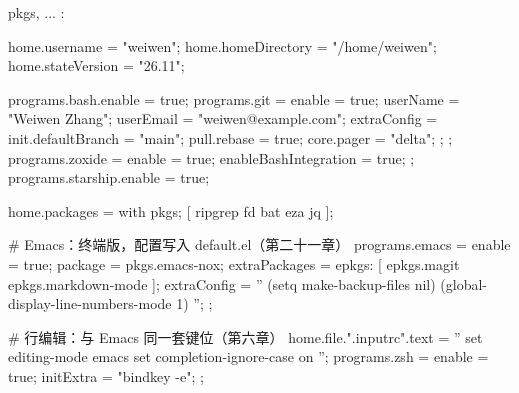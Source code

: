 \begin{nixcode}
{ pkgs, ... }:

{
  home.username = "weiwen";
  home.homeDirectory = "/home/weiwen";
  home.stateVersion = "26.11";

  programs.bash.enable = true;
  programs.git = {
    enable = true;
    userName = "Weiwen Zhang";
    userEmail = "weiwen@example.com";
    extraConfig = {
      init.defaultBranch = "main";
      pull.rebase = true;
      core.pager = "delta";
    };
  };
  programs.zoxide = {
    enable = true;
    enableBashIntegration = true;
  };
  programs.starship.enable = true;

  home.packages = with pkgs; [
    ripgrep
    fd
    bat
    eza
    jq
  ];

  # Emacs：终端版，配置写入 default.el（第二十一章）
  programs.emacs = {
    enable = true;
    package = pkgs.emacs-nox;
    extraPackages = epkgs: [
      epkgs.magit
      epkgs.markdown-mode
    ];
    extraConfig = ''
      (setq make-backup-files nil)
      (global-display-line-numbers-mode 1)
    '';
  };

  # 行编辑：与 Emacs 同一套键位（第六章）
  home.file.".inputrc".text = ''
    set editing-mode emacs
    set completion-ignore-case on
  '';
  programs.zsh = {
    enable = true;
    initExtra = "bindkey -e";
  };
}
\end{nixcode}
